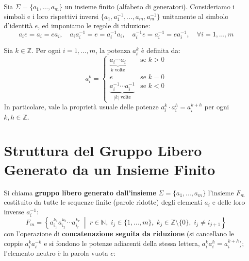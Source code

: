 \begin{definicion}
Sia $\Sigma = \{a_1, \dots, a_m\}$ un insieme finito (alfabeto di generatori).
Consideriamo i simboli e i loro rispettivi inversi $\{a_1, a_1^{-1}, \dots, a_m, a_m^{-1}\}$ unitamente al simbolo d'identità $e$, ed imponiamo le regole di riduzione:
\[
a_i e = a_i = e a_i, \quad a_i a_i^{-1} = e = a_i^{-1} a_i, \quad a_i^{-1} e = a_i^{-1} = e a_i^{-1}, \quad \forall i = 1, \dots, m
\]

Sia $k \in \mathbb{Z}$. Per ogni $i = 1, \dots, m$, la potenza $a_i^k$ è definita da:
\[
a_i^k = 
\begin{cases}
    \underbrace{a_i \cdots a_i}_{k \text{ volte}} & \text{se } k > 0 \\[1em]
    e & \text{se } k = 0 \\[0.5em]
    \underbrace{a_i^{-1} \cdots a_i^{-1}}_{|k| \text{ volte}} & \text{se } k < 0
\end{cases}
\]
In particolare, vale la proprietà usuale delle potenze $a_i^k \cdot a_i^h = a_i^{k+h}$ per ogni $k, h \in \mathbb{Z}$.
\end{definicion}

\section{Struttura del Gruppo Libero Generato da un Insieme Finito}

\begin{definicion}
Si chiama \textbf{gruppo libero generato dall'insieme} $\Sigma = \{a_1, \dots, a_m\}$ l'insieme $F_m$ costituito da tutte le sequenze finite (parole ridotte) degli elementi $a_i$ e delle loro inverse $a_i^{-1}$:
\[
F_m = \left\{ a_{i_1}^{k_1} a_{i_2}^{k_2} \cdots a_{i_r}^{k_r} \;\middle|\; r \in \mathbb{N}, \; i_j \in \{1, \dots, m\}, \; k_j \in \mathbb{Z} \setminus \{0\}, \; i_j \neq i_{j+1} \right\}
\]
con l'operazione di \textbf{concatenazione seguita da riduzione} (si cancellano le coppie $a_i^{k} a_i^{-k}$ e si fondono le potenze adiacenti della stessa lettera, $a_i^k a_i^h = a_i^{k+h}$); l'elemento neutro \`e la parola vuota $e$:
\end{definicion}

